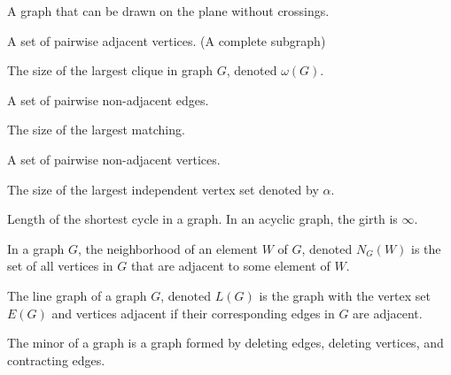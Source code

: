 \begin{definition}
    A graph that can be drawn on the plane without crossings.
\end{definition} 

\begin{definition}[Clique]
    A set of pairwise adjacent vertices. (A complete subgraph)
\end{definition} 

\begin{definition}
    The size of the largest clique in graph $G$, denoted $\omega(G)$.
\end{definition} 

\begin{definition}
    A set of pairwise non-adjacent edges.
\end{definition} 

\begin{definition}
    The size of the largest matching.
\end{definition} 

\begin{definition}
    A set of pairwise non-adjacent vertices.
\end{definition}

\begin{definition}
    The size of the largest independent vertex set denoted by $\alpha$.
\end{definition} 

\begin{definition}[Girth]
    Length of the shortest cycle in a graph. In an acyclic graph, the girth is $\infty$.
\end{definition} 

\begin{definition}[Neighborhood]
    In a graph $G$, the neighborhood of an element $W$ of $G$, denoted $N_G(W)$ is the set of all vertices in $G$ that are adjacent to some element of $W$.
\end{definition}


\begin{definition}
    The line graph of a graph $G$, denoted $L(G)$ is the graph with the vertex set $E(G)$ and vertices adjacent if their corresponding edges in $G$ are adjacent.
\end{definition} 

\begin{definition}[Minor]
    The minor of a graph is a graph formed by deleting edges, deleting vertices, and contracting edges.
\end{definition} 
